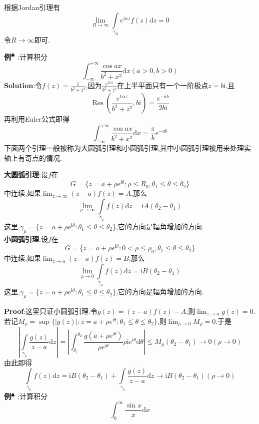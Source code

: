 根据Jordan引理有
$$
\lim_{R\to\infty}\int\limits_{\gamma_R}e^{\mathrm{i}\alpha z}f(z)\mathrm{d}z=0
$$
令$R\to\infty$即可.\par
\textbf{例}$^\spadesuit$ :计算积分
$$
\int_{-\infty}^{+\infty}\frac{\cos ax}{b^2+x^2}\mathrm{d}x(a>0,b>0)
$$
\qquad \textbf{Solution}:令$f(z)=\frac{1}{b^2+z^2}$,因为$\frac{e^{1\alpha z}}{b^2+z^2}$在上半平面只有一个一阶极点$z=b\mathrm{i}$,且
$$
\operatorname{Res}\left(\frac{e^{1\alpha z}}{b^2+z^2},b\mathrm{i}\right)=\frac{e^{-ab}}{2b\mathrm{i}}
$$
再利用Euler公式即得
$$
\int_{-\infty}^{+\infty}\frac{\cos ax}{b^2+x^2}\mathrm{d}x=\frac{\pi}{b}e^{-ab}
$$
\qquad 下面两个引理一般被称为大圆弧引理和小圆弧引理,其中小圆弧引理被用来处理实轴上有奇点的情况.
\begin{tcolorbox}[colback=KuangNei,colframe=BianKuang,title=\textbf{大圆弧引理和小圆弧引理},sharpish corners]
    \textbf{大圆弧引理}:设$f$在
    $$
    G=\{z=a+\rho e^{\mathrm{i}\theta}:\rho\leqslant R_0,\theta_1\leqslant \theta\leqslant \theta_2\}
    $$
    中连续,如果$\lim_{z\to\infty}(z-a)f(z)=A$,那么
    $$
    \lim_{\rho\to\infty}\int\limits_{\gamma_\rho}f(z)\mathrm{d}z=\mathrm{i}A(\theta_2-\theta_1)
    $$
    这里,$\gamma_\rho=\{z=a+\rho e^{\mathrm{i}\theta}:\theta_1\leqslant \theta\leqslant \theta_2\}$,它的方向是辐角增加的方向.\\
    \textbf{小圆弧引理}:设$f$在
    $$
    G=\{z=a+\rho e^{\mathrm{i}\theta}:0<\rho\leqslant\rho_0,\theta_1\leqslant \theta\leqslant \theta_2\}
    $$
    中连续,如果$\lim_{z\to a}(z-a)f(z)=B$,那么
    $$
    \lim_{\rho\to 0}\int\limits_{\gamma_\rho}f(z)\mathrm{d}z=\mathrm{i}B(\theta_2-\theta_1)
    $$
    这里,$\gamma_\rho=\{z=a+\rho e^{\mathrm{i}\theta}:\theta_1\leqslant \theta\leqslant \theta_2\}$,它的方向是辐角增加的方向.
\end{tcolorbox}
\textbf{Proof}:这里只证小圆弧引理.令$g(z)=(z-a)f(z)-A$,则$\lim_{z\to a}g(z)=0$.若记$M_{\rho}=\sup\{|g(z)|:z=a+\rho e^{\mathrm{i}\theta}:\theta_1\leqslant \theta\leqslant \theta_2\}$,则$\lim_{\rho\to 0}M_{\rho}=0$.于是
$$
\left|\int\limits_{\gamma_\rho}\frac{g(z)}{z-a}\mathrm{d}z\right|=\left|\int^{\theta_2}_{\theta_1}\frac{g(a+\rho e^{\mathrm{i}\theta})}{\rho e^{\mathrm{i}\theta}}\rho \mathrm{i}e^{\mathrm{i}\theta}\mathrm{d}\theta\right|\leqslant M_{\rho}(\theta_2-\theta_1)\to 0(\rho\to 0)
$$
由此即得
$$
\int\limits_{\gamma_\rho}f(z)\mathrm{d}z=\mathrm{i}B(\theta_2-\theta_1)+\int\limits_{\gamma_\rho}\frac{g(z)}{z-a}\mathrm{d}z\to \mathrm{i}B(\theta_2-\theta_1)(\rho \to 0)
$$
\qquad \textbf{例}$^\spadesuit$ :计算积分
$$
\int_0^{\infty}\frac{\sin x}{x}\mathrm{d}x
$$
